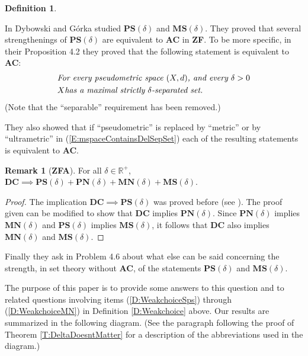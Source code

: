 \documentclass[11pt, reqno]{amsart}
\theoremstyle{definition}
\numberwithin{theorem}{section}
\theoremstyle{definition}
\newtheorem{remark}[theorem]{Remark}
\theoremstyle{definition}
\theoremstyle{definition}
\theoremstyle{definition}
\newtheorem{definition}[theorem]{Definition}
\theoremstyle{definition}
\numberwithin{claim}{section}
\theoremstyle{definition}
\theoremstyle{definition}
\theoremstyle{definition}
\theoremstyle{definition}
\theoremstyle{definition}
\newcommand{\PS}{\mathbf{PS}(\delta)}
\newcommand{\MS}{\mathbf{MS}(\delta)}
\newcommand{\PN}{\mathbf{PN}(\delta)}
\newcommand{\MN}{\mathbf{MN}(\delta)}
\theoremstyle{remboldstyle}
\begin{document}
\begin{definition}
\begin{enumerate}
\end{enumerate}
\end{definition}
\par 
In \cite{Dyb-Gorka1} Dybowski and G\'{o}rka studied $\PS$ and $\MS$.  They proved that several strengthenings of $\PS$ are equivalent to \textbf{AC} in \textbf{ZF}.  To be more specific, in their Proposition 4.2 they proved that the following statement is equivalent to \textbf{AC}:
\begin{equation}
\begin{aligned}
\label{E:mspaceContainsDelSepSet}
&\mbox{\it For every pseudometric space $(X, d)$, and every $\delta >0$} \\ & X \mbox{\it has a maximal strictly } \delta\mbox{\it -separated set.}
\end{aligned}
\end{equation}
(Note that the ``separable'' requirement has been removed.)
\par
They also showed that if ``pseudometric'' is replaced by ``metric'' or by ``ultrametric'' in (\ref{E:mspaceContainsDelSepSet}) each of the resulting statements is equivalent to \textbf{AC}. 
\begin{remark}[\textbf{ZFA}]\label{rem1}
For all $\delta \in \mathbb{R}^+$, $\mathbf{DC} \implies \PS + \PN + \MN + \MS$.
\end{remark}
\begin{proof}
The implication $\mathbf{DC} \implies \PS$ was proved before (see \cite[Corollary 4.5]{Dyb-Gorka1}). The proof given can be modified to show that \textbf{DC} implies $\PN$.
Since $\PN$ implies $\MN$ and $\PS$ implies $\MS$, it follows that \textbf{DC} also implies $\MN$ and $\MS$. 
\end{proof}
Finally they ask in Problem 4.6 about what else can be said concerning the strength, in set theory without \textbf{AC}, of the statements $\PS$ and $\MS$.
\par 
The purpose of this paper is to provide some answers to this question and to related questions involving items (\ref{D:WeakchoiceSps}) through (\ref{D:WeakchoiceMN}) in Definition \ref{D:Weakchoice} above.  Our results are summarized in the following diagram.  (See the paragraph following the proof of Theorem \ref{T:DeltaDoesntMatter} for a description of the abbreviations used in the diagram.)
\end{document}
